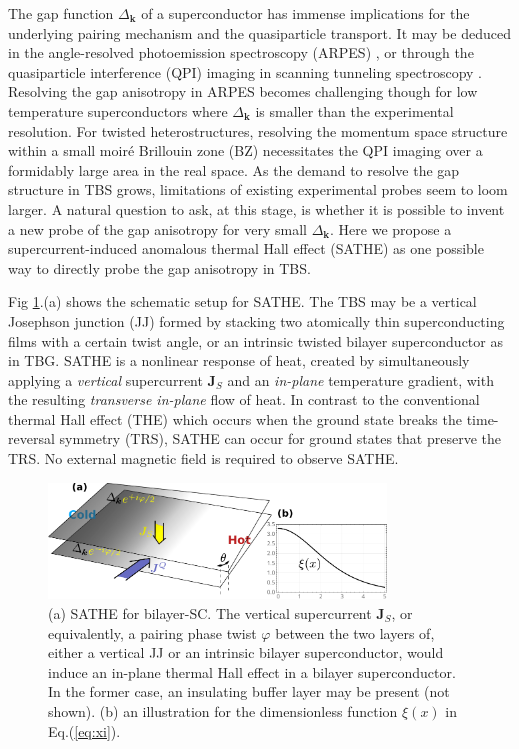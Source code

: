 The gap function $\varDelta_{\bm{k}}$ of a superconductor has immense implications for the underlying pairing mechanism and the quasiparticle transport. It may be deduced in the angle-resolved photoemission spectroscopy (ARPES) \cite{shen1993anomalously,ding1996angle,zhang2016superconducting}, or through the quasiparticle interference (QPI) imaging in scanning tunneling spectroscopy \cite{hanaguri2007quasiparticle,sprau2017discovery}. Resolving the gap anisotropy in ARPES becomes challenging though for low temperature superconductors where $\varDelta_{\bm{k}}$ is smaller than the experimental resolution. For twisted heterostructures, resolving the momentum space structure within a small moir\'e Brillouin zone (BZ) necessitates the QPI imaging over a formidably large area in the real space. As the demand to resolve the gap structure in TBS grows, limitations of existing experimental probes seem to loom larger. A natural question to ask, at this stage, is whether it is possible to invent a new probe of the gap anisotropy for very small $\varDelta_{\bm{k}}$. Here we propose a supercurrent-induced anomalous thermal Hall effect (SATHE) as one possible way to directly probe the gap anisotropy in TBS. 

Fig \ref{fig: setup}.(a) shows the schematic setup for SATHE. The TBS may be a vertical Josephson junction (JJ) formed by stacking two atomically thin superconducting films with a certain twist angle, or an intrinsic twisted bilayer superconductor as in TBG. SATHE is a nonlinear response of heat, created by simultaneously applying a \emph{vertical} supercurrent $\bm J_S$ and an {\it in-plane} temperature gradient, with the resulting {\it transverse in-plane} flow of heat. In contrast to the conventional thermal Hall effect (THE) which occurs when the ground state breaks the time-reversal symmetry (TRS), SATHE can occur for ground states that preserve the TRS. No external magnetic field is required to observe SATHE. 

\begin{figure}[!ht]
	\centering
	\includegraphics[width=0.8\textwidth]{contents/SATHE/figures/illustration.pdf}
	\caption{(a) SATHE for bilayer-SC. The vertical supercurrent $\bm{J}_S$, or equivalently, a pairing phase twist $\varphi$ between the two layers of, either a vertical JJ or an intrinsic bilayer superconductor, would induce an in-plane thermal Hall effect in a bilayer superconductor. In the former case, an insulating buffer layer may be present (not shown).  (b) an illustration for the dimensionless function $\xi(x)$ in Eq.(\ref{eq:xi}).}
	\label{fig: setup}
\end{figure}

